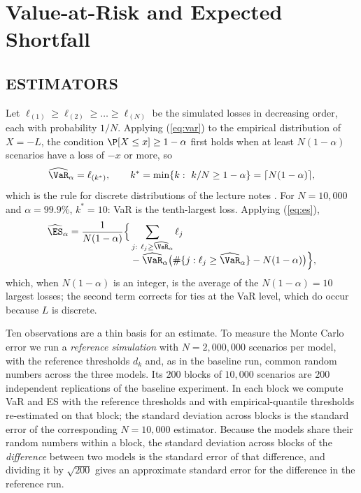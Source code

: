 \section{Value-at-Risk and Expected Shortfall}
\label{sec:results}

\subsection{ESTIMATORS}
Let $\ell_{(1)}\ge\ell_{(2)}\ge\dots\ge\ell_{(N)}$ be the simulated losses in decreasing order, each with probability $1/N$. Applying (\ref{eq:var}) to the empirical distribution of $X=-L$, the condition $\P[X\le x]\ge1-\alpha$ first holds when at least $N(1-\alpha)$ scenarios have a loss of $-x$ or more, so
\[
\widehat{\VaR}_\alpha=\ell_{(k^*)},\qquad k^*=\min\{k:\ k/N\ge1-\alpha\}=\lceil N(1-\alpha)\rceil ,
\]
which is the rule for discrete distributions of the lecture notes \citep[Ch.~1]{DeGiorgi26}. For $N=10{,}000$ and $\alpha=99.9\%$, $k^*=10$: VaR is the tenth-largest loss. Applying (\ref{eq:es}),
\begin{align*}
\widehat{\ES}_\alpha=\frac{1}{N(1-\alpha)}\Big\{&\sum_{j:\ \ell_j\ge\widehat{\VaR}_\alpha}\ell_j\\[-4pt]
&-\widehat{\VaR}_\alpha\big(\#\{j:\ell_j\ge\widehat{\VaR}_\alpha\}-N(1-\alpha)\big)\Big\},
\end{align*}
which, when $N(1-\alpha)$ is an integer, is the average of the $N(1-\alpha)=10$ largest losses; the second term corrects for ties at the VaR level, which do occur because $L$ is discrete.

Ten observations are a thin basis for an estimate. To measure the Monte Carlo error we run a \emph{reference simulation} with $N=2{,}000{,}000$ scenarios per model, with the reference thresholds $d_k$ and, as in the baseline run, common random numbers across the three models. Its $200$ blocks of $10{,}000$ scenarios are $200$ independent replications of the baseline experiment. In each block we compute VaR and ES with the reference thresholds and with empirical-quantile thresholds re-estimated on that block; the standard deviation across blocks is the standard error of the corresponding $N=10{,}000$ estimator. Because the models share their random numbers within a block, the standard deviation across blocks of the \emph{difference} between two models is the standard error of that difference, and dividing it by $\sqrt{200}$ gives an approximate standard error for the difference in the reference run.

